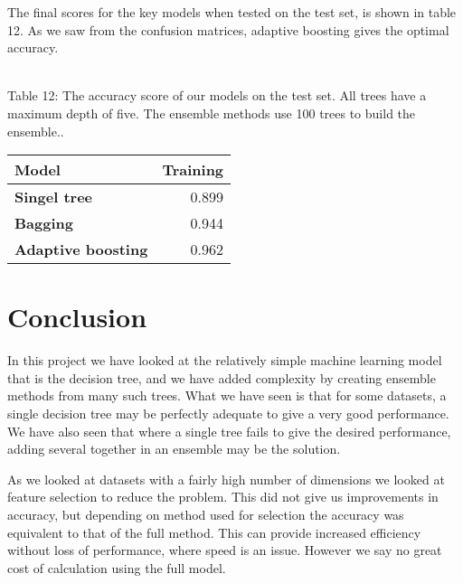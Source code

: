 \documentclass[11pt]{article}
\begin{document}
 
The final scores for the key models when tested on the test set, is shown in table 12. As we saw from the confusion matrices, adaptive boosting gives the optimal accuracy.

{ \hspace*{\fill} \\}
Table 12: The accuracy score of our models on the test set. All trees have a maximum depth of five. The ensemble methods use 100 trees to build the ensemble..
\begin{table}[h!]
	\begin{center}
		\label{tab:table1}
		\begin{tabular}{l|r}
			\textbf{Model}                                                 	& \textbf{Training} \\ \hline
			\textbf{Singel tree}                           		             & 0.899            \\ \hline
			\textbf{Bagging}                                    		     & 0.944            \\ \hline
			\textbf{Adaptive boosting}   							    	 & 0.962            \\ \hline
		\end{tabular}
	\end{center}
\end{table}


    \hypertarget{conclusion}{%
\section{Conclusion}\label{conclusion}}

In this project we have looked at the relatively simple machine learning model that is the decision tree, and we have added complexity by creating ensemble methods from many such trees. What we have seen is that for some datasets, a single decision tree may be perfectly adequate to give a very good performance. We have also seen that where a single tree fails to give the desired performance, adding several together in an ensemble may be the solution. 

As we looked at datasets with a fairly high number of dimensions we looked at feature selection to reduce the problem. This did not give us improvements in accuracy, but depending on method used for selection the accuracy was equivalent to that of the full method. This can provide increased efficiency without loss of performance, where speed is an issue. However we say no great cost of calculation using the full model.
\end{document}
